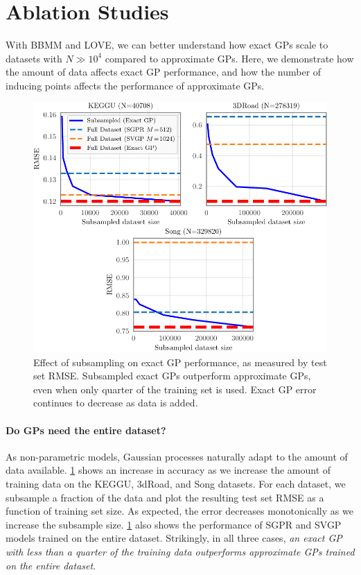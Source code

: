\section{Ablation Studies}
With BBMM and LOVE, we can better understand how exact GPs scale to datasets with $N\gg 10^4$ compared to approximate GPs.
Here, we demonstrate how the amount of data affects exact GP performance, and how the number of inducing points affects the performance of approximate GPs.

\begin{figure}[t!]
  \centering
  \includegraphics[width=0.7\linewidth]{figures/subsampling.pdf}
  \caption[Effect of subsampling on exact GP performance.]{
    Effect of subsampling on exact GP performance, as measured by test set RMSE.
    Subsampled exact GPs outperform approximate GPs, even when only quarter of the training set is used.
    Exact GP error continues to decrease as data is added.
  }
  \label{fig:subsampling_results}
\end{figure}

\paragraph{Do GPs need the entire dataset?}
As non-parametric models, Gaussian processes naturally adapt to the amount of data available.
\cref{fig:subsampling_results} shows an increase in accuracy as we increase the amount of training data on the KEGGU, 3dRoad, and Song datasets.
For each dataset, we subsample a fraction of the data and plot the resulting test set RMSE as a function of training set size.
As expected, the error decreases monotonically as we increase the subsample size.
\cref{fig:subsampling_results} also shows the performance of SGPR and SVGP models trained on the entire dataset.
Strikingly, in all three cases, \textit{an exact GP with less than a quarter of the training data outperforms approximate GPs trained on the entire dataset}.

